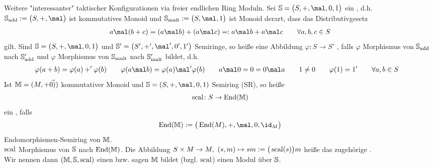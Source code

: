 \begin{beispiel}
	Weitere "interessanter" taktischer Konfigurationen via freier endlichen Ring Moduln.\nl
	Sei $\S=\big(S,+,\mal,0,1\big)$ ein , d.h. $\S_{\add}:=\big(S,+,\mal\big)$ ist kommutatives Monoid und $\S_{\mult}:=\big(S,\mal,1\big)$ ist Monoid derart, dass das Distributivgesetz
	\begin{align*}
		a\mal(b+c)=(a\mal b)+(a\mal c)=:a\mal b+a\mal c\qquad\forall a,b,c\in S
	\end{align*}
	gilt.
	Sind $\S=\big(S,+,\mal,0,1\big)$ und $\S'=\big(S',+',\mal',0',1'\big)$ Semiringe, so heiße eine Abbildung $\varphi\colon S\to S'$ , falls $\varphi$ Morphismus von $\S_{\add}$ nach $\S'_{\add}$ und $\varphi$ Morphismus von $\S_{\mult}$ nach $\S_{\mult}'$ bildet, d.h.
	\begin{align*}
		\varphi(a+b)&=\varphi(a)+'\varphi(b)\qquad
		\varphi(a\mal b)=\varphi(a)\mal'\varphi(b)\qquad
		a\mal 0=0=0\mal a\qquad
		1\neq 0\qquad
		\varphi(1)=1'\qquad\forall a,b\in S
	\end{align*}
	Ist $\M=(M,+\vec{0)})$ kommutativer Monoid und $\S=(S,+,\mal,0,1)$ Semiring (SR), so heiße 
	\begin{align*}
		\scal\colon S\to\End(\M)
	\end{align*}
	ein , falls
	\begin{align*}
		\End(\M):=\big(\End(M),+,\mal,0,\id_M\big)
	\end{align*}
	Endomorphismen-Semiring von $\M$.\\
	$\scal$ Morphismus von $\S$ nach $\End(\M)$.\nl
	Die Abbildung $S\times M\to M,~(s,m)\mapsto sm:=\big(\scal(s)\big)m$
	heiße das zugehörige .
	\\
	Wir nennen dann $(\M,\S,\scal)$ einen  bzw. sagen $\M$ bildet (bzgl. $\scal$) einen Modul über $\S$.
\end{beispiel}